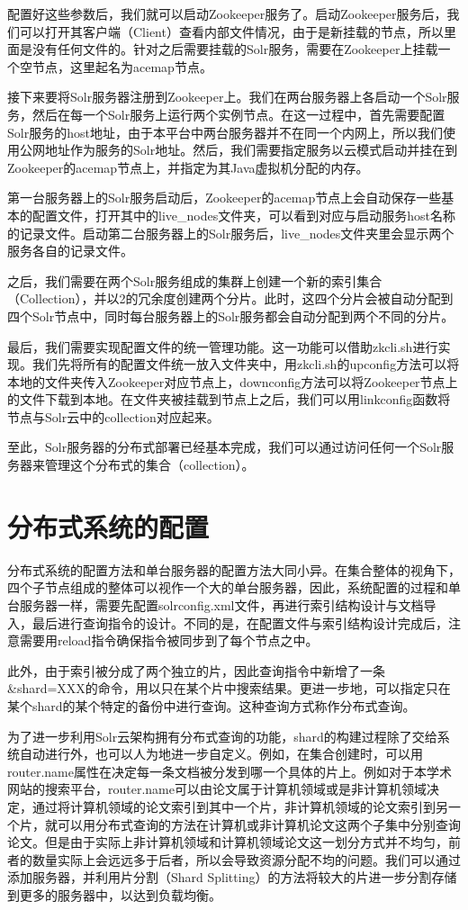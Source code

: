配置好这些参数后，我们就可以启动Zookeeper服务了。启动Zookeeper服务后，我们可以打开其客户端（Client）查看内部文件情况，由于是新挂载的节点，所以里面是没有任何文件的。针对之后需要挂载的Solr服务，需要在Zookeeper上挂载一个空节点，这里起名为acemap节点。

接下来要将Solr服务器注册到Zookeeper上。我们在两台服务器上各启动一个Solr服务，然后在每一个Solr服务上运行两个实例节点。在这一过程中，首先需要配置Solr服务的host地址，由于本平台中两台服务器并不在同一个内网上，所以我们使用公网地址作为服务的Solr地址。然后，我们需要指定服务以云模式启动并挂在到Zookeeper的acemap节点上，并指定为其Java虚拟机分配的内存。

第一台服务器上的Solr服务启动后，Zookeeper的acemap节点上会自动保存一些基本的配置文件，打开其中的live\_nodes文件夹，可以看到对应与启动服务host名称的记录文件。启动第二台服务器上的Solr服务后，live\_nodes文件夹里会显示两个服务各自的记录文件。

之后，我们需要在两个Solr服务组成的集群上创建一个新的索引集合（Collection），并以2的冗余度创建两个分片。此时，这四个分片会被自动分配到四个Solr节点中，同时每台服务器上的Solr服务都会自动分配到两个不同的分片。

最后，我们需要实现配置文件的统一管理功能。这一功能可以借助zkcli.sh进行实现。我们先将所有的配置文件统一放入文件夹中，用zkcli.sh的upconfig方法可以将本地的文件夹传入Zookeeper对应节点上，downconfig方法可以将Zookeeper节点上的文件下载到本地。在文件夹被挂载到节点上之后，我们可以用linkconfig函数将节点与Solr云中的collection对应起来。

至此，Solr服务器的分布式部署已经基本完成，我们可以通过访问任何一个Solr服务器来管理这个分布式的集合（collection）。

\section{分布式系统的配置}
分布式系统的配置方法和单台服务器的配置方法大同小异。在集合整体的视角下，四个子节点组成的整体可以视作一个大的单台服务器，因此，系统配置的过程和单台服务器一样，需要先配置solrconfig.xml文件，再进行索引结构设计与文档导入，最后进行查询指令的设计。不同的是，在配置文件与索引结构设计完成后，注意需要用reload指令确保指令被同步到了每个节点之中。

此外，由于索引被分成了两个独立的片，因此查询指令中新增了一条\&shard=XXX的命令，用以只在某个片中搜索结果。更进一步地，可以指定只在某个shard的某个特定的备份中进行查询。这种查询方式称作分布式查询。

为了进一步利用Solr云架构拥有分布式查询的功能，shard的构建过程除了交给系统自动进行外，也可以人为地进一步自定义。例如，在集合创建时，可以用router.name属性在决定每一条文档被分发到哪一个具体的片上。例如对于本学术网站的搜索平台，router.name可以由论文属于计算机领域或是非计算机领域决定，通过将计算机领域的论文索引到其中一个片，非计算机领域的论文索引到另一个片，就可以用分布式查询的方法在计算机或非计算机论文这两个子集中分别查询论文。但是由于实际上非计算机领域和计算机领域论文这一划分方式并不均匀，前者的数量实际上会远远多于后者，所以会导致资源分配不均的问题。我们可以通过添加服务器，并利用片分割（Shard Splitting）的方法将较大的片进一步分割存储到更多的服务器中，以达到负载均衡。

